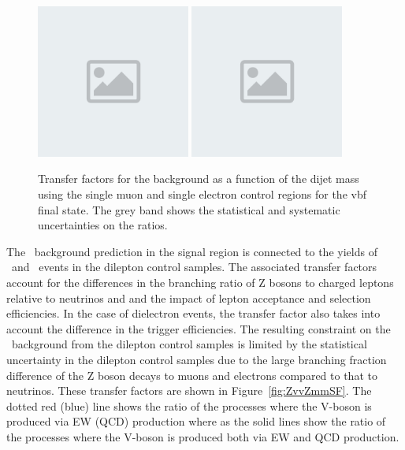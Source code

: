 \begin{figure}[htbp]
  \centering
        \includegraphics[width=0.45\textwidth]{placeholder.png}
        \includegraphics[width=0.45\textwidth]{placeholder.png}
  \caption{Transfer factors for the \Wlv background as a function of the dijet mass using the single muon and single electron control regions for the vbf final state. The grey band shows the statistical and systematic uncertainties on the ratios.}
    \label{fig:WMvvscalefactor}
\end{figure}


The \Zvv~background prediction in the signal region is connected to the yields of \Zmm~and \Zee~events
in the dilepton control samples. The associated transfer factors account for the differences in the
branching ratio of Z bosons to charged leptons relative to neutrinos and and the impact of lepton acceptance and selection
efficiencies. In the case of dielectron events, the transfer factor also takes into account the
difference in the trigger efficiencies. The resulting constraint on the \Zvv~background from the dilepton
control samples is limited by the statistical uncertainty in the dilepton control samples due to the large
branching fraction difference of the Z boson decays to muons and electrons compared to that to neutrinos.
These transfer factors are shown in Figure~\ref{fig:ZvvZmmSF}. The dotted red (blue) line shows the ratio of the processes where the V-boson
is produced via EW (QCD) production where as the solid lines show the ratio of the processes where the V-boson is produced both
via EW and QCD production.

